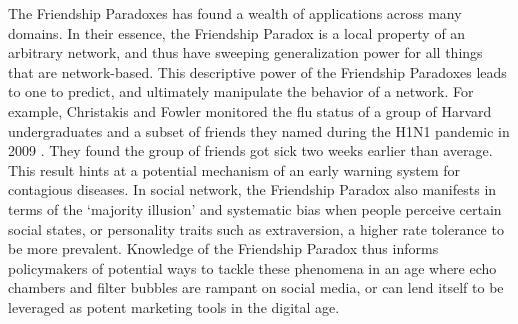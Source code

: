 \documentclass[12pt,reqno, a4]{amsart}
\begin{document}
The Friendship Paradoxes has found a wealth of applications across many domains. In their essence, the Friendship Paradox is a local property of an arbitrary network, and thus have sweeping generalization power for all things that are network-based. This descriptive power of the Friendship Paradoxes leads to one to predict, and ultimately manipulate the behavior of a network. For example, Christakis and Fowler monitored the flu status of a group of Harvard undergraduates and a subset of friends they named during the H1N1 pandemic in 2009 \cite{christakis_social_2010}. They found the group of friends got sick two weeks earlier than average. This result hints at a potential mechanism of an early warning system for contagious diseases. In social network, the Friendship Paradox also manifests in terms of the `majority illusion' \cite{lerman_majority_2016} and systematic bias \cite{jackson_friendship_2019} when people perceive certain social states, or personality traits such as extraversion, a higher rate tolerance to be more prevalent. Knowledge of the Friendship Paradox thus informs policymakers of potential ways to tackle these phenomena in an age where echo chambers and filter bubbles are rampant on social media, or can lend itself to be leveraged as potent marketing tools \cite{ben_sliman_asymmetric_2018} in the digital age.

\printbibliography
\end{document}
